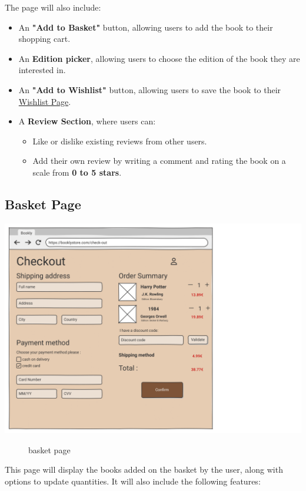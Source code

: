 The page will also include:
\begin{itemize}
    \item An \textbf{"Add to Basket"} button, allowing users to add the book to their shopping cart.
    \item An \textbf{Edition picker}, allowing users to choose the edition of the book they are interested in.
    \item An \textbf{"Add to Wishlist"} button, allowing users to save the book to their \hyperref[sec:wishlist]{Wishlist Page}.
    \item A \textbf{Review Section}, where users can:
    \begin{itemize}
        \item Like or dislike existing reviews from other users.
        \item Add their own review by writing a comment and rating the book on a scale from \textbf{0 to 5 stars}.
    \end{itemize}
\end{itemize}



\subsection{Basket Page} \label{sec:basket}

\includegraphics[width=0.6\linewidth]{HW1Report/photos/checkout2.png}

\begin{figure}[h!]
    \centering
    \caption{basket page}
    \label{fig:enter-label}
\end{figure}

This page will display the books added on the basket by the user, along with options to update quantities. It will also include the following features:

